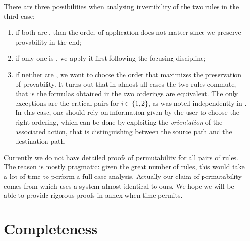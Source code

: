 There are three possibilities when analysing invertibility of the two rules in
the third case:
\begin{enumerate}
  \item if both are , then the order of application does not matter
  since we preserve provability in the end;
  \item if only one is , we apply it first following the focusing
  discipline;
  \item if neither are , we want to choose the order that maximizes
  the preservation of provability. It turns out that in almost all cases the two
  rules commute, that is the formulas obtained in the two orderings are
  equivalent. The only exceptions are the critical pairs  for $i \in \{1,2\}$, as was noted independently in
  . In this case, one should rely on
  information given by the user to choose the right ordering, which can be done
  by exploiting the \emph{orientation} of the associated  action, that is
  distinguishing between the source path and the destination path.
\end{enumerate}
Currently we do not have detailed proofs of permutability for all pairs of
rules. The reason is mostly pragmatic: given the great number of rules, this
would take a lot of time to perform a full case analysis. Actually our claim of
permutability comes from \cite{DBLP:conf/cade/Chaudhuri21} which uses a
 system almost identical to ours. We hope we will be able to
provide rigorous proofs in annex when time permits.

\section{Completeness}


